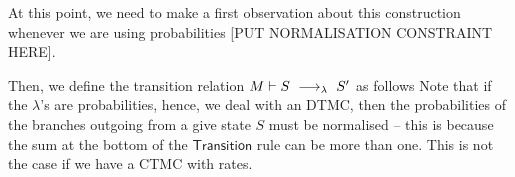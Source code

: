 At this point, we need to make a first observation about this
construction whenever we are using probabilities [PUT NORMALISATION
CONSTRAINT HERE].


Then, we define the transition relation $M\vdash S\ \longrightarrow_{\lambda}\ S'$ as
follows
Note that if the $\lambda$'s are probabilities, hence, we deal with an
DTMC, then the probabilities of the branches outgoing from a give
state $S$ must be normalised -- this is because the sum at the bottom
of the $\mathsf{Transition}$ rule can be more than one. This is not
the case if we have a CTMC with rates.


%

